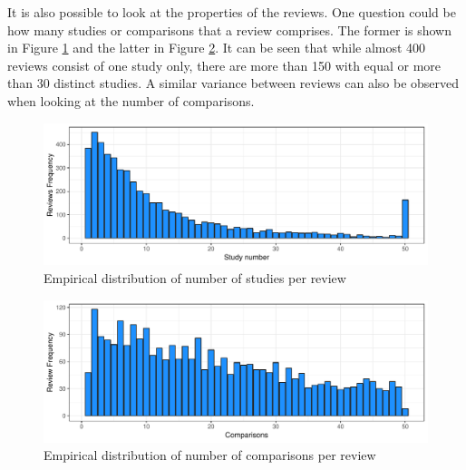 \documentclass[11pt,a4paper,twoside]{book}\usepackage[]{graphicx}\usepackage[]{color}
\newenvironment{knitrout}{}{} %
\begin{document}
It is also possible to look at the properties of the reviews. One question could be how many studies or comparisons that a review comprises. The former is shown in Figure \ref{studies.per.review} and the latter in Figure \ref{comparisons.per.review}. It can be seen that while almost 400 reviews consist of one study only, there are more than 150 with equal or more than 30 distinct studies. A similar variance between reviews can also be observed when looking at the number of comparisons.

\begin{figure}
\begin{knitrout}
\color{fgcolor}

{\centering \includegraphics[width=\textwidth-3cm]{figure/ch02_figunnamed-chunk-10-1} 

}



\end{knitrout}
\caption{Empirical distribution of number of studies per review}
\label{studies.per.review}
\end{figure}

\begin{figure}
\begin{knitrout}
\color{fgcolor}

{\centering \includegraphics[width=\textwidth-3cm]{figure/ch02_figunnamed-chunk-11-1} 

}



\end{knitrout}
\caption{Empirical distribution of number of comparisons per review}
\label{comparisons.per.review}
\end{figure}
\end{document}
